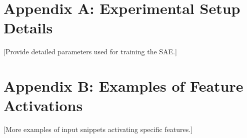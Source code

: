 \documentclass{article}
\begin{document}
\printbibliography


\appendix
\section{Appendix A: Experimental Setup Details}
[Provide detailed parameters used for training the SAE.]

\section{Appendix B: Examples of Feature Activations}
[More examples of input snippets activating specific features.]
\end{document}
